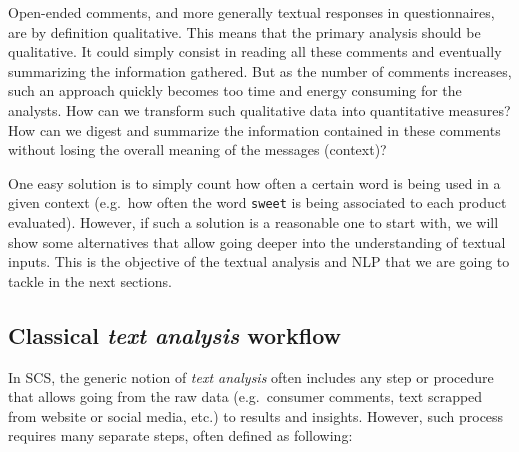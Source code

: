 \documentclass[
]{krantz}
\begin{document}
Open-ended comments, and more generally textual responses in questionnaires, are by definition qualitative. This means that the primary analysis should be qualitative. It could simply consist in reading all these comments and eventually summarizing the information gathered. But as the number of comments increases, such an approach quickly becomes too time and energy consuming for the analysts. How can we transform such qualitative data into quantitative measures? How can we digest and summarize the information contained in these comments without losing the overall meaning of the messages (context)?

One easy solution is to simply count how often a certain word is being used in a given context (e.g.~how often the word \texttt{sweet} is being associated to each product evaluated). However, if such a solution is a reasonable one to start with, we will show some alternatives that allow going deeper into the understanding of textual inputs. This is the objective of the textual analysis and NLP that we are going to tackle in the next sections.

\hypertarget{classical-text-analysis-workflow}{%
\subsection{\texorpdfstring{Classical \emph{text analysis} workflow}{Classical text analysis workflow}}\label{classical-text-analysis-workflow}}

In SCS, the generic notion of \emph{text analysis} often includes any step or procedure that allows going from the raw data (e.g.~consumer comments, text scrapped from website or social media, etc.) to results and insights. However, such process requires many separate steps, often defined as following:
\end{document}
